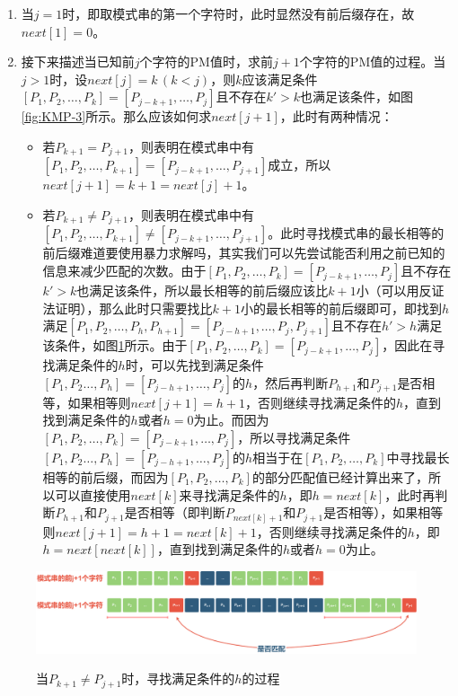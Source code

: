 \begin{enumerate}
    \item 当$j = 1$时，即取模式串的第一个字符时，此时显然没有前后缀存在，故$next[1] = 0$。
    \item 接下来描述当已知前$j$个字符的PM值时，求前$j + 1$个字符的PM值的过程。当$j > 1$时，设$next[j] = k\,(k < j )$，则$k$应该满足条件$[P_1, P_2, \dots, P_{k}] = [P_{j - k + 1}, \dots, P_{j}]$且不存在$k' > k$也满足该条件，如图\ref{fig:KMP-3}所示。那么应该如何求$next[j + 1]$，此时有两种情况：
    \begin{itemize}
        \item 若$P_{k + 1} = P_{j + 1}$，则表明在模式串中有$[P_1, P_2, \dots, P_{k + 1}] = [P_{j - k + 1}, \dots, P_{j + 1}]$成立，所以$next[j + 1] = k + 1 = next[j] + 1$。
        \item 若$P_{k + 1} \neq P_{j + 1}$，则表明在模式串中有$[P_1, P_2, \dots, P_{k + 1}] \neq [P_{j - k + 1}, \dots, P_{j + 1}]$。此时寻找模式串的最长相等的前后缀难道要使用暴力求解吗，其实我们可以先尝试能否利用之前已知的信息来减少匹配的次数。由于$[P_1, P_2, \dots, P_k] = [P_{j - k + 1}, \dots, P_j]$且不存在$k' > k$也满足该条件，所以最长相等的前后缀应该比$k + 1$小（可以用反证法证明），那么此时只需要找比$k + 1$小的最长相等的前后缀即可，即找到$h$满足$[P_1, P_2, \dots, P_h, P_{h + 1}] = [P_{j - h + 1}, \dots, P_j, P_{j + 1}]$且不存在$h' > h$满足该条件，如图\ref{fig:KMP-4}所示。由于$[P_1, P_2, \dots, P_k] = [P_{j - k + 1}, \dots, P_j]$，因此在寻找满足条件的$h$时，可以先找到满足条件$[P_1, P_2 \dots, P_h] = [P_{j - h + 1}, \dots, P_j]$的$h$，然后再判断$P_{h + 1}$和$P_{j + 1}$是否相等，如果相等则$next[j + 1] = h + 1$，否则继续寻找满足条件的$h$，直到找到满足条件的$h$或者$h = 0$为止。而因为$[P_1, P_2, \dots, P_k] = [P_{j - k + 1}, \dots, P_j]$，所以寻找满足条件$[P_1, P_2 \dots, P_h] = [P_{j - h + 1}, \dots, P_j]$的$h$相当于在$[P_1, P_2, \dots, P_k]$中寻找最长相等的前后缀，而因为$[P_1, P_2, \dots, P_k]$的部分匹配值已经计算出来了，所以可以直接使用$next[k]$来寻找满足条件的$h$，即$h = next[k]$，此时再判断$P_{h + 1}$和$P_{j + 1}$是否相等（即判断$P_{next[k] + 1}$和$P_{j  + 1}$是否相等），如果相等则$next[j + 1] = h + 1 = next[k] + 1$，否则继续寻找满足条件的$h$，即$h = next[next[k]]$，直到找到满足条件的$h$或者$h = 0$为止。
    \end{itemize}
\end{enumerate}

\begin{figure}[!htb]
    \centering
    \includegraphics[width=\linewidth]{images/KMP-4.pdf}\\
    \caption{当$P_{k + 1} \neq P_{j + 1}$时，寻找满足条件的$h$的过程}
    \label{fig:KMP-4}
\end{figure}

